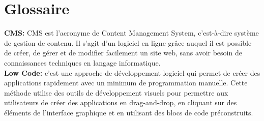 \chapter{Glossaire}
\label{chap:Glossary}


\hspace{\parindent}\textbf{CMS:} CMS est l’acronyme de Content Management System, c’est-à-dire système de gestion de contenu. Il s’agit d’un logiciel en ligne grâce auquel il est possible de créer, de gérer et de modifier facilement un site web, sans avoir besoin de connaissances techniques en langage informatique.\\

\textbf{Low Code:} c'est une approche de développement logiciel qui permet de créer des applications rapidement avec un minimum de programmation manuelle. Cette méthode utilise des outils de développement visuels pour permettre aux utilisateurs de créer des applications en drag-and-drop, en cliquant sur des éléments de l’interface graphique et en utilisant des blocs de code préconstruits.


\pagebreak